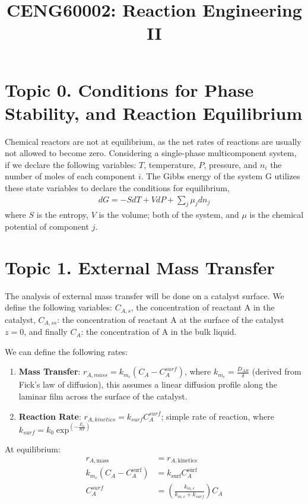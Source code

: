 \documentclass{article}
\title{CENG60002: Reaction Engineering II}
\begin{document}
\maketitle
\section{Topic 0. Conditions for Phase Stability, and Reaction Equilibrium}

Chemical reactors are not at equilibrium, as the net rates of reactions are usually not allowed to become zero. Considering a single-phase multicomponent system, if we declare the following variables: \(T\), temperature, \(P\), pressure, and \(n_i\) the number of moles of each component \(i\). The Gibbs energy of the system G utilizes these state variables to declare the conditions for equilibrium, 
\begin{align*}
    dG = -SdT + VdP + \sum_{j} \mu_j dn_j
\end{align*}
where \(S\) is the entropy, \(V\) is the volume; both of the system, and \(\mu\) is the chemical potential of component \(j\).



\section{Topic 1. External Mass Transfer}

The analysis of external mass transfer will be done on a catalyst surface. We define the following variables: \(C_{A,s}\), the concentration of reactant A in the catalyst, \(C_{A,ss}\): the concentration of reactant A at the surface of the catalyst \(z=0\), and finally \(C_A\): the concentration of A in the bulk liquid. 

We can define the following rates:
\begin{enumerate}
    \item \textbf{Mass Transfer}: \(r_{A,mass} = k_{m_c}\left(C_A - C_A^{surf}\right)\), where \(k_{m_c} = \frac{D_{AB}}{\delta}\) (derived from Fick's law of diffusion), this assumes a linear diffusion profile along the laminar film across the surface of the catalyst.
    \item \textbf{Reaction Rate}: \(r_{A,kinetics} = k_{surf} C_A^{surf}\); simple rate of reaction, where \(k_{surf} = k_0 \exp^{\left(-\frac{E_a}{RT}\right)}\)
\end{enumerate}

At equilibrium:
\begin{align*}
r_{A,\text{mass}} &= r_{A,\text{kinetics}} \\
k_{m_c}\left(C_A - C_A^{\text{surf}}\right) &= k_{\text{surf}} C_A^{\text{surf}} \\
C_{A}^{surf} &= \left(\frac{k_{m,c}}{k_{m,c} + k_{surf}}\right) C_A
\end{align*}
\end{document}
